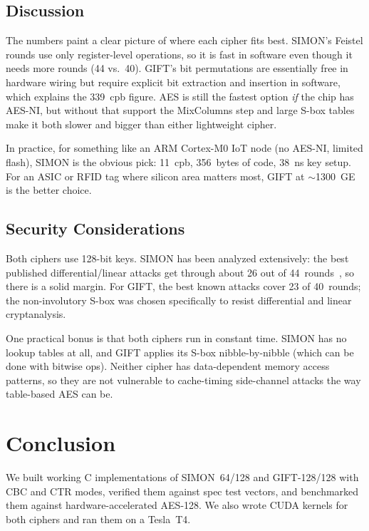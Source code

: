 \documentclass[conference]{IEEEtran}
\begin{document}
\subsection{Discussion}

The numbers paint a clear picture of where each cipher fits best.
SIMON's Feistel rounds use only register-level operations, so it is
fast in software even though it needs more rounds (44 vs.\ 40).  GIFT's
bit permutations are essentially free in hardware wiring but require
explicit bit extraction and insertion in software, which explains the
339~cpb figure.  AES is still the fastest option \emph{if} the chip has
AES-NI, but without that support the MixColumns step and large S-box
tables make it both slower and bigger than either lightweight cipher.

In practice, for something like an ARM Cortex-M0 IoT node (no AES-NI,
limited flash), SIMON is the obvious pick: 11~cpb, 356~bytes of code,
38~ns key setup.  For an ASIC or RFID tag where silicon area matters
most, GIFT at $\sim$1300~GE is the better choice.

\subsection{Security Considerations}

Both ciphers use 128-bit keys.  SIMON has been analyzed extensively:
the best published differential/linear attacks get through about 26 out
of 44~rounds~\cite{beaulieu2013simon}, so there is a solid margin.
For GIFT, the best known attacks cover 23 of 40~rounds; the
non-involutory S-box was chosen specifically to resist differential
and linear cryptanalysis.

One practical bonus is that both ciphers run in constant time.  SIMON
has no lookup tables at all, and GIFT applies its S-box
nibble-by-nibble (which can be done with bitwise ops).  Neither cipher
has data-dependent memory access patterns, so they are not vulnerable
to cache-timing side-channel attacks the way table-based AES can be.

\section{Conclusion}

We built working C implementations of SIMON~64/128 and GIFT-128/128
with CBC and CTR modes, verified them against spec test vectors, and
benchmarked them against hardware-accelerated AES-128.  We also wrote
CUDA kernels for both ciphers and ran them on a Tesla~T4.
\end{document}
